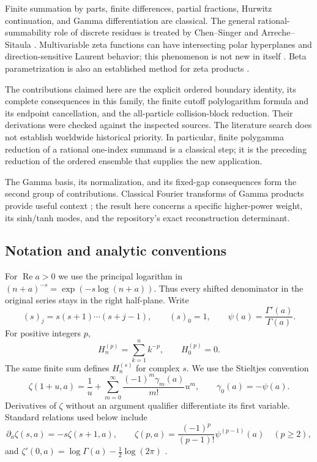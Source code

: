 \documentclass[11pt,a4paper]{article}
\numberwithin{equation}{section}
\theoremstyle{definition}
\theoremstyle{remark}
\newcommand{\Rea}{\operatorname{Re}}
\begin{document}
Finite summation by parts, finite differences, partial fractions,
Hurwitz continuation, and Gamma differentiation are classical.
The general rational-summability role of discrete residues is treated
by Chen--Singer and Arreche--Sitaula \cite{chen-singer,arreche-sitaula}.
Multivariable zeta functions can have intersecting polar hyperplanes
and direction-sensitive Laurent behavior; this phenomenon is not new
in itself \cite{matsumoto-ono-wakabayashi}. Beta parametrization is also
an established method for zeta products \cite{shpot-paris}.

The contributions claimed here are the explicit ordered boundary
identity, its complete consequences in this family, the finite cutoff
polylogarithm formula and its endpoint cancellation, and the
all-particle collision-block reduction. Their derivations were checked
against the inspected sources. The literature search does not establish
worldwide historical priority. In particular, finite polygamma
reduction of a rational one-index summand is a classical step; it is
the preceding reduction of the ordered ensemble that supplies the
new application.

The Gamma basis, its normalization, and its fixed-gap consequences form
the second group of contributions. Classical Fourier transforms of
Gamma products provide useful context \cite{ramanujan-transform};
the result here concerns a specific higher-power weight, its
sinh/tanh modes, and the repository's exact reconstruction determinant.

\subsection{Notation and analytic conventions}

For $\Rea a>0$ we use the principal logarithm in
$(n+a)^{-s}=\exp(-s\log(n+a))$. Thus every shifted denominator in
the original series stays in the right half-plane. Write
\[
 (s)_j=s(s+1)\cdots(s+j-1),\qquad (s)_0=1,
 \qquad \psi(a)=\frac{\Gamma'(a)}{\Gamma(a)}.
\]
For positive integers $p$,
\[
 H_n^{(p)}=\sum_{k=1}^{n}k^{-p},\qquad H_0^{(p)}=0.
\]
The same finite sum defines $H_n^{(s)}$ for complex $s$.
We use the Stieltjes convention
\begin{equation}\label{eq:stieltjes-convention}
 \zeta(1+u,a)=\frac1u+
    \sum_{m=0}^{\infty}\frac{(-1)^m\gamma_m(a)}{m!}u^m,
 \qquad \gamma_0(a)=-\psi(a).
\end{equation}
Derivatives of $\zeta$ without an argument qualifier differentiate its
first variable. Standard relations used below include
\begin{equation}\label{eq:classical-ladders}
 \partial_a\zeta(s,a)=-s\zeta(s+1,a),\qquad
 \zeta(p,a)=\frac{(-1)^p}{(p-1)!}\psi^{(p-1)}(a)\quad(p\ge2),
\end{equation}
and $\zeta'(0,a)=\log\Gamma(a)-\tfrac12\log(2\pi)$
\cite{dlmf:hurwitz,dlmf:gamma}.
\end{document}
